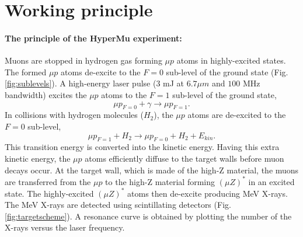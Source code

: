 \documentclass[12pt]{article}
\begin{document}
\section{Working principle}
\paragraph{The principle of the HyperMu experiment:}
Muons are stopped in hydrogen gas forming ${\mu}p$ atoms in highly-excited states. The formed ${\mu}p$ atoms de-excite to the $F=0$ sub-level of the ground state (Fig. \ref{fig:sublevels}). A high-energy laser pulse ($3$ mJ at $6.7 {\mu}m$ and $100$ MHz bandwidth) excites the ${\mu}p$ atoms to the $F=1$ sub-level of the ground state,
\begin{equation*}
{\mu}p_{F=0} + {\gamma} \rightarrow {\mu}p_{F=1}.
\end{equation*}
In collisions with hydrogen molecules ($H_2$), the $\mu{p}$ atoms are de-excited to the $F=0$ sub-level,
\begin{equation*}
{\mu}p_{F=1} + H_2 \rightarrow {\mu}p_{F=0} + H_2 + E_{kin}.
\end{equation*}
This transition energy is converted into the kinetic energy. Having this extra kinetic energy, the ${\mu}p$ atoms efficiently diffuse to the target walls before muon decays occur. At the target wall, which is made of the high-Z material, the muons are transferred from the $\mu{p}$ to the high-Z material forming $({\mu}Z)^{*}$ in an excited state. The highly-excited $({\mu}Z)^{*}$ atoms then de-excite producing MeV X-rays. The MeV X-rays are detected using scintillating detectors (Fig. \ref{fig:targetscheme}). A resonance curve is obtained by plotting the number of the X-rays versus the laser frequency. 
\end{document}
